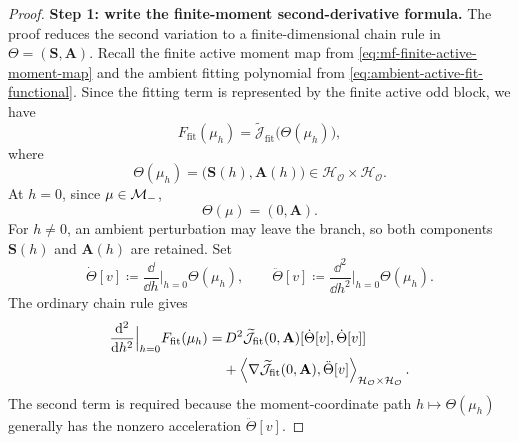 \begin{proof}
\noindent\textbf{Step 1: write the finite-moment second-derivative formula.}
The proof reduces the second variation to a finite-dimensional chain rule in
\(\Theta=(\mathbf S,\mathbf A)\).  Recall the finite active moment map from
\cref{eq:mf-finite-active-moment-map} and the ambient fitting polynomial from
\cref{eq:ambient-active-fit-functional}.
Since the fitting term is represented by the finite active odd block, we have
\[
    F_{\mathrm{fit}}(\mu_h)
    =
    \widetilde{\mathcal J}_{\mathrm{fit}}\bigl(\Theta(\mu_h)\bigr),
\]
where
\[
    \Theta(\mu_h)
    =
    \bigl(\mathbf S(h),\mathbf A(h)\bigr)
    \in
    \mathcal H_{\mathcal O}\times\mathcal H_{\mathcal O}.
\]
At \(h=0\), since \(\mu\in\mathcal{M}_{-}\),
\[
    \Theta(\mu)=(0,\mathbf A).
\]
For \(h\ne0\), an ambient perturbation may leave the branch, so both
components \(\mathbf S(h)\) and \(\mathbf A(h)\) are retained.
Set
\[
    \dot\Theta[v]
    \coloneq
    \frac{\dd}{\dd h}\Big|_{h=0}\Theta(\mu_h),
    \qquad
    \ddot\Theta[v]
    \coloneq
    \frac{\dd^2}{\dd h^2}\Big|_{h=0}\Theta(\mu_h).
\]
The ordinary chain rule gives
\begin{align}
\label{eq:fit-second-variation-chain-Mminus}
    \frac{\dd^2}{\dd h^2}\Big|_{h=0}
    F_{\mathrm{fit}}(\mu_h)
    =
    &\,
    D^2\widetilde{\mathcal J}_{\mathrm{fit}}(0,\mathbf A)
    [\dot\Theta[v],\dot\Theta[v]]
    \\
    &+
    \left\langle 
        \nabla\widetilde{\mathcal J}_{\mathrm{fit}}(0,\mathbf A)
    ,
        \ddot\Theta[v]
    \right\rangle_{\mathcal H_{\mathcal O}\times\mathcal H_{\mathcal O}}.
\end{align}
The second term is required because the moment-coordinate path
\(h\mapsto\Theta(\mu_h)\) generally has the nonzero acceleration
\(\ddot\Theta[v]\).



\end{proof}
